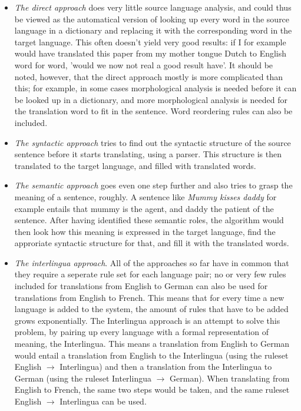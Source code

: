 \documentclass[12pt]{article}
\begin{document}
\begin{itemize}
\item \emph{The direct approach} does very little source language analysis, and could thus be viewed as the automatical version of looking up every word in the source language in a dictionary and replacing it with the corresponding word in the target language. This often doesn't yield very good results: if I for example would have translated this paper from my mother tongue Dutch to English word for word, 'would we now not real a good result have'. It should be noted, however, that the direct approach mostly is more complicated than this; for example, in some cases morphological analysis is needed before it can be looked up in a dictionary, and more morphological analysis is needed for the translation word to fit in the sentence. Word reordering rules can also be included.
\item \emph{The syntactic approach} tries to find out the syntactic structure of the source sentence before it starts translating, using a parser. This structure is then translated to the target language, and filled with translated words.
\item \emph{The semantic approach} goes even one step further and also tries to grasp the meaning of a sentence, roughly. A sentence like \emph{Mummy kisses daddy} for example entails that mummy is the agent, and daddy the patient of the sentence. After having identified these semantic roles, the algorithm would then look how this meaning is expressed in the target language, find the approriate syntactic structure for that, and fill it with the translated words.
\item \emph{The interlingua approach}. All of the approaches so far have in common that they require a seperate rule set for each language pair; no or very few rules included for translations from English to German can also be used for translations from English to French. This means that for every time a new language is added to the system, the amount of rules that have to be added grows exponentially. The Interlingua approach is an attempt to solve this problem, by pairing up every language with a formal representation of meaning, the Interlingua. This means a translation from English to German would entail a translation from English to the Interlingua (using the ruleset English $\rightarrow$ Interlingua) and then a translation from the Interlingua to German (using the ruleset Interlingua $\rightarrow$ German). When translating from English to French, the same two steps would be taken, and the same ruleset English $\rightarrow$ Interlingua can be used.
\end{itemize}
\end{document}
